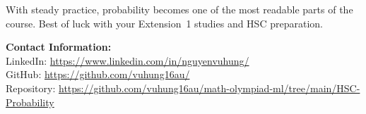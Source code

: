 \documentclass[12pt]{article}
\begin{document}
With steady practice, probability becomes one of the most readable parts of the course. Best of luck with your Extension~1 studies and HSC preparation.

\vspace{2em}
\noindent\textbf{Contact Information:}\\[0.5em]
LinkedIn: \href{https://www.linkedin.com/in/nguyenvuhung/}{https://www.linkedin.com/in/nguyenvuhung/}\\[0.3em]
GitHub: \href{https://github.com/vuhung16au/}{https://github.com/vuhung16au/}\\[0.3em]
Repository: \href{https://github.com/vuhung16au/math-olympiad-ml/tree/main/HSC-Probability}{https://github.com/vuhung16au/math-olympiad-ml/tree/main/HSC-Probability}
\end{document}
